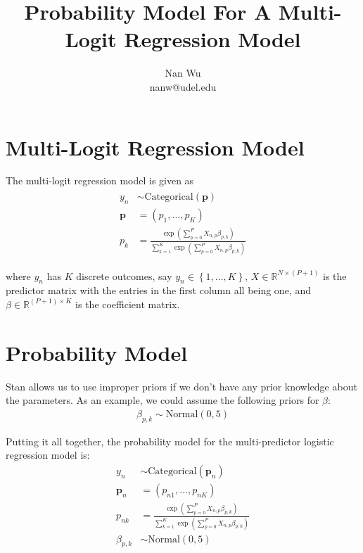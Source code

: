 \documentclass[12pt]{article}
\begin{document}
\title{Probability Model For A Multi-Logit Regression Model}
\author{Nan Wu \\ nanw@udel.edu}
\date{}
\maketitle

\section{Multi-Logit Regression Model}

The multi-logit regression model is given as
\begin{align}
\begin{split}
  y_n &\sim \mathrm{Categorical} \left(\mathbf{p}\right) \\
  \mathbf{p} &=\left(p_1,\ldots,p_K \right)\\
  p_k &= \frac{\exp\left( \sum\limits_{p=0}^P X_{n,p}\beta_{p,k} \right)}{\sum \limits_{k=1}^K \exp \left( \sum\limits_{p=0}^P X_{n,p}\beta_{p,k} \right)}
\end{split}
\end{align}

where $y_n$ has $K$ discrete outcomes, say $y_n \in \left\{1,\ldots,K\right\}$, $X\in \mathbb{R}^{N \times (P+1)}$ is the predictor matrix with the entries in the first column all being one, and $\beta \in \mathbb{R}^{(P+1) \times K}$ is the coefficient matrix.

\section{Probability Model}

Stan allows us to use improper priors if we don't have any prior knowledge about the parameters. As an example, we could assume the following priors for $\beta$:
\begin{align*}
\beta_{p,k} \sim \mathrm{Normal}\left( 0,5 \right)
\end{align*}

Putting it all together, the probability model for the multi-predictor logistic regression model is:
\begin{align*}
  y_n &\sim \mathrm{Categorical} \left(\mathbf{p}_n\right) \\
  \mathbf{p}_n &=\left(p_{n1},\ldots,p_{nK} \right) \\
  p_{nk} &= \frac{\exp\left( \sum\limits_{p=0}^P X_{n,p}\beta_{p,k} \right)}{\sum \limits_{k=1}^K \exp \left( \sum\limits_{p=0}^P X_{n,p}\beta_{p,k} \right)} \\
  \beta_{p,k} &\sim \mathrm{Normal}\left( 0,5 \right)
\end{align*}
\end{document}
